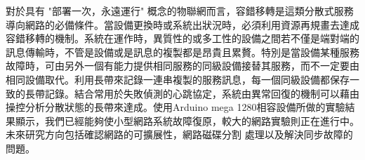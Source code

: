 \begin{abstractCH}

\setlength{\baselineskip}{1.5em}

對於具有 "部署一次，永遠運行" 概念的物聯網而言，容錯移轉是這類分散式服務導向網路的必備條件。當設備更換時或系統出狀況時，必須利用資源再規畫去達成容錯移轉的機制。系統在運作時，異質性的或多工性的設備之間若不僅是端對端的訊息傳輸時，不管是設備或是訊息的複製都是昂貴且累贅。特別是當設備某種服務故障時，可由另外一個有能力提供相同服務的同級設備接替其服務，而不一定要由相同設備取代。利用長帶來記錄一連串複製的服務訊息，每一個同級設備都保存一致的長帶記錄。結合常用於失敗偵測的心跳協定，系統由異常回復的機制可以藉由操控分析分散狀態的長帶來達成。使用Arduino mega 1280相容設備所做的實驗結果顯示，我們已經能夠使小型網路系統故障復原，較大的網路實驗則正在進行中。未來研究方向包括確認網路的可擴展性，網路磁碟分割 處理以及解決同步故障的問題。

\end{abstractCH}
